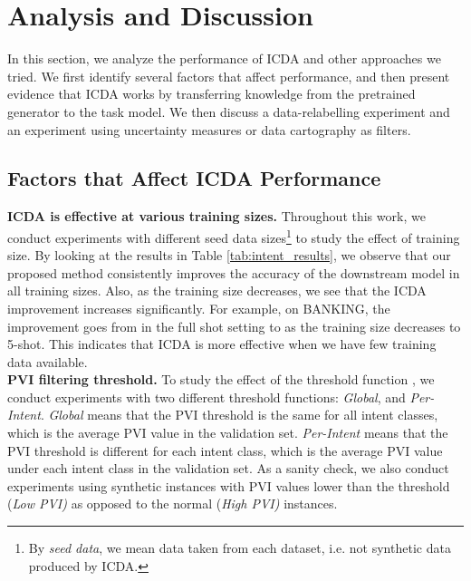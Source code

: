\documentclass[11pt]{article}
\begin{document}
\section{Analysis and Discussion}
\label{sec:analysis}

In this section, we analyze the performance of ICDA and other approaches we tried. 
We first identify several factors that affect performance, and then present evidence that ICDA works by transferring knowledge from the pretrained generator to the task model. We then discuss a data-relabelling experiment and an experiment using uncertainty measures or data cartography \cite{swayamdipta2020dataset} as filters.

\subsection{Factors that Affect ICDA Performance}

\noindent \textbf{ICDA is effective at various training sizes.}
Throughout this work, we conduct experiments with different seed data sizes\footnote{By \emph{seed data}, we mean data taken from each dataset, i.e. not synthetic data produced by ICDA.} to study the effect of training size.
By looking at the results in Table \ref{tab:intent_results}, we observe that our proposed method consistently improves the accuracy of the downstream model in all training sizes.
Also, as the training size decreases, we see that the ICDA improvement increases significantly.
For example, on BANKING, the improvement goes from  in the full shot setting to  as the training size decreases to 5-shot.
This indicates that ICDA is more effective when we have few training data available. \\

\noindent \textbf{PVI filtering threshold.}
To study the effect of the threshold function , we conduct experiments with two different threshold functions: \textit{Global}, and \textit{Per-Intent}. 
\textit{Global} means that the PVI threshold is the same for all intent classes, which is the average PVI value in the validation set.
\textit{Per-Intent} means that the PVI threshold is different for each intent class, which is the average PVI value under each intent class in the validation set. As a sanity check, we also conduct experiments using synthetic instances with PVI values lower than the threshold (\textit{Low PVI)} as opposed to the normal (\textit{High PVI)} instances.
\end{document}
